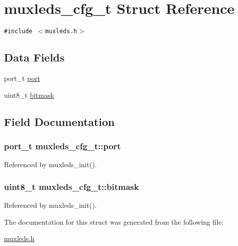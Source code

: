 \hypertarget{structmuxleds__cfg__t}{
\section{muxleds\_\-cfg\_\-t Struct Reference}
\label{structmuxleds__cfg__t}
}
{\tt \#include $<$muxleds.h$>$}

\subsection*{Data Fields}
\begin{CompactItemize}
\item 
port\_\-t \hyperlink{structmuxleds__cfg__t_6c2bc51207a88f331cc70763c393876d}{port}
\item 
uint8\_\-t \hyperlink{structmuxleds__cfg__t_fbd147a4e6a4037650b4626a9409a422}{bitmask}
\end{CompactItemize}


\subsection{Field Documentation}
\hypertarget{structmuxleds__cfg__t_6c2bc51207a88f331cc70763c393876d}{
\subsubsection{\setlength{\rightskip}{0pt plus 5cm}port\_\-t {\bf muxleds\_\-cfg\_\-t::port}}}
\label{structmuxleds__cfg__t_6c2bc51207a88f331cc70763c393876d}




Referenced by muxleds\_\-init().\hypertarget{structmuxleds__cfg__t_fbd147a4e6a4037650b4626a9409a422}{
\subsubsection{\setlength{\rightskip}{0pt plus 5cm}uint8\_\-t {\bf muxleds\_\-cfg\_\-t::bitmask}}}
\label{structmuxleds__cfg__t_fbd147a4e6a4037650b4626a9409a422}




Referenced by muxleds\_\-init().

The documentation for this struct was generated from the following file:\begin{CompactItemize}
\item 
\hyperlink{muxleds_8h}{muxleds.h}\end{CompactItemize}

